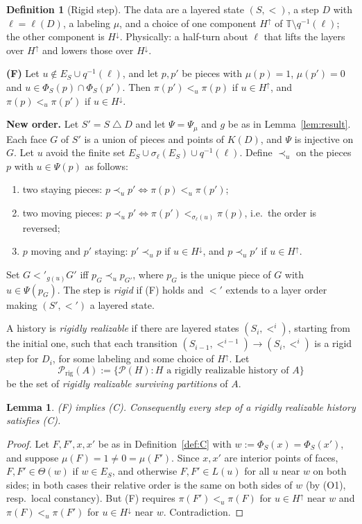 \documentclass[11pt]{amsart}
\newtheorem{lemma}[theorem]{Lemma}
\theoremstyle{definition}
\newtheorem{definition}[theorem]{Definition}
\theoremstyle{remark}
\newcommand{\T}{\mathbb{T}}
\newcommand{\Prig}{\mathcal{P}_{\mathrm{rig}}}
\newcommand{\Surv}{\mathcal{P}}
\newcommand{\up}{H^{\uparrow}}
\newcommand{\down}{H^{\downarrow}}
\begin{document}
\begin{definition}[Rigid step]\label{def:rigid}
The data are a layered state $(S,<)$, a step $D$ with $\ell=\ell(D)$, a labeling $\mu$, and a
choice of one component $\up$ of $\T\setminus q^{-1}(\ell)$; the other component is $\down$.
Physically: a half-turn about $\ell$ that lifts the layers over $\up$ and lowers those over
$\down$.

\smallskip\noindent\textbf{(F)} Let $u\notin E_S\cup q^{-1}(\ell)$, and let $p,p'$ be pieces with
$\mu(p)=1$, $\mu(p')=0$ and $u\in\Phi_S(p)\cap\Phi_S(p')$. Then
$\pi(p')<_u\pi(p)$ if $u\in\up$, and $\pi(p)<_u\pi(p')$ if $u\in\down$.

\smallskip\noindent\textbf{New order.} Let $S'=S\mathbin{\triangle}D$ and let $\Psi=\Psi_\mu$ and
$g$ be as in Lemma~\ref{lem:result}. Each face $G$ of $S'$ is a union of pieces and points of
$K(D)$, and $\Psi$ is injective on $G$. Let $u$ avoid the finite set
$E_S\cup\sigma_\ell(E_S)\cup q^{-1}(\ell)$. Define $\prec_u$ on the pieces $p$ with
$u\in\Psi(p)$ as follows:
\begin{enumerate}[label=(\roman*)]
\item two staying pieces: $p\prec_u p'\iff\pi(p)<_u\pi(p')$;
\item two moving pieces: $p\prec_u p'\iff\pi(p')<_{\sigma_\ell(u)}\pi(p)$, i.e.\ the order is
reversed;
\item $p$ moving and $p'$ staying: $p'\prec_u p$ if $u\in\down$, and $p\prec_u p'$ if $u\in\up$.
\end{enumerate}
Set $G<'_{g(u)}G'$ iff $p_G\prec_u p_{G'}$, where $p_G$ is the unique piece of $G$ with
$u\in\Psi(p_G)$. The step is \emph{rigid} if (F) holds and $<'$ extends to a layer order making
$(S',<')$ a layered state.
\end{definition}

A history is \emph{rigidly realizable} if there are layered states $(S_i,<^i)$, starting from the
initial one, such that each transition $(S_{i-1},<^{i-1})\to(S_i,<^i)$ is a rigid step for $D_i$,
for some labeling and some choice of $\up$. Let
\[
\Prig(A):=\{\Surv(H) : H \text{ a rigidly realizable history of } A\}
\]
be the set of \emph{rigidly realizable surviving partitions} of $A$.

\begin{lemma}\label{lem:FC}
(F) implies (C). Consequently every step of a rigidly realizable history satisfies (C).
\end{lemma}
\begin{proof}
Let $F,F',x,x'$ be as in Definition~\ref{def:C} with $w:=\Phi_S(x)=\Phi_S(x')$, and suppose
$\mu(F)=1\ne0=\mu(F')$. Since $x,x'$ are interior points of faces, $F,F'\in\Theta(w)$ if
$w\in E_S$, and otherwise $F,F'\in L(u)$ for all $u$ near $w$ on both sides; in both cases their
relative order is the same on both sides of $w$ (by (O1), resp.\ local constancy). But (F)
requires $\pi(F')<_u\pi(F)$ for $u\in\up$ near $w$ and $\pi(F)<_u\pi(F')$ for $u\in\down$ near
$w$. Contradiction.
\end{proof}
\end{document}
